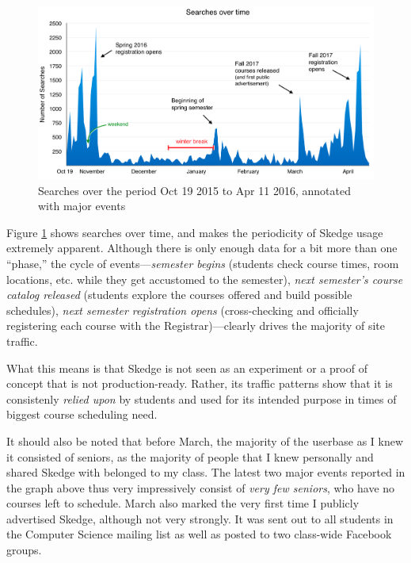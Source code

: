 \begin{figure}[H]
  \centering

  \includegraphics[width=1.0\textwidth]{images/graph/searches}

  \caption[Searches over the period Oct 19 2015 to Apr 11 2016]{Searches over the period Oct 19 2015 to Apr 11 2016, annotated with major events}
  \label{fig:searches}

\end{figure}

Figure \ref{fig:searches} shows searches over time, and makes the periodicity of Skedge usage extremely apparent. Although there is only enough data for a bit more than one ``phase,'' the cycle of events---\emph{semester begins} (students check course times, room locations, etc. while they get accustomed to the semester), \emph{next semester's course catalog released} (students explore the courses offered and build possible schedules), \emph{next semester registration opens} (cross-checking and officially registering each course with the Registrar)---clearly drives the majority of site traffic.

What this means is that Skedge is not seen as an experiment or a proof of concept that is not production-ready. Rather, its traffic patterns show that it is consistenly \emph{relied upon} by students and used for its intended purpose in times of biggest course scheduling need.

It should also be noted that before March, the majority of the userbase as I knew it consisted of seniors, as the majority of people that I knew personally and shared Skedge with belonged to my class. The latest two major events reported in the graph above thus very impressively consist of \emph{very few seniors}, who have no courses left to schedule. March also marked the very first time I publicly advertised Skedge, although not very strongly. It was sent out to all students in the Computer Science mailing list as well as posted to two class-wide Facebook groups.

